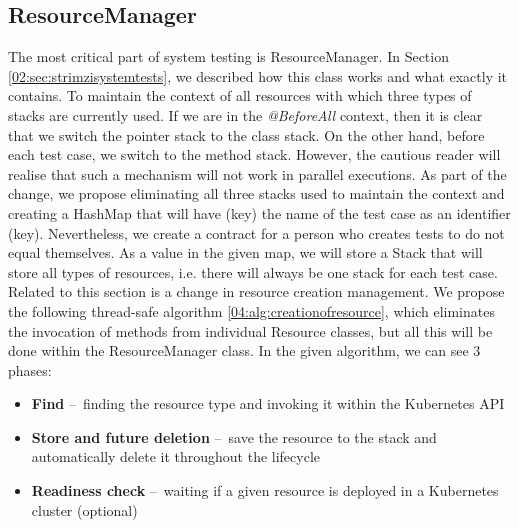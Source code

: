 \subsection{ResourceManager}

The most critical part of system testing is ResourceManager. In Section \ref {02:sec:strimzisystemtests}, we described how this class works and what exactly it contains. To maintain the context of all resources with which three types of stacks are currently used. If we are in the \emph{@BeforeAll} context, then it is clear that we switch the pointer stack to the class stack. On the other hand, before each test case, we switch to the method stack. However, the cautious reader will realise that such a mechanism will not work in parallel executions. As part of the change, we propose eliminating all three stacks used to maintain the context and creating a HashMap that will have (key) the name of the test case as an identifier (key). Nevertheless, we create a contract for a person who creates tests to do not equal themselves. As a value in the given map, we will store a Stack that will store all types of resources, i.e. there will always be one stack for each test case. Related to this section is a change in resource creation management. We propose the following thread-safe algorithm \ref{04:alg:creationofresource}, which eliminates the invocation of methods from individual Resource classes, but all this will be done within the ResourceManager class. In the given algorithm, we can see 3 phases:

\begin{itemize}[itemsep=1mm, parsep=0pt]
    \item \textbf{Find} \---\ finding the resource type and invoking it within the Kubernetes API
    \item \textbf {Store and future deletion} \---\ save the resource to the stack and automatically delete it throughout the lifecycle
    \item \textbf {Readiness check} \---\ waiting if a given resource is deployed in a Kubernetes cluster (optional)
\end{itemize}

